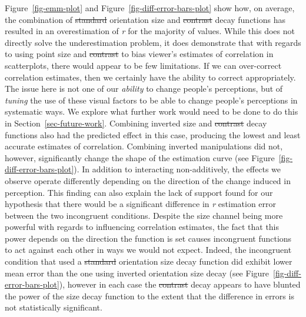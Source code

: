 \documentclass[manuscript, review, anonymous, screen]{acmart}
\providecommand{\DIFaddtex}[1]{{\protect\color{blue}\uwave{#1}}} %
\providecommand{\DIFdeltex}[1]{{\protect\color{red}\sout{#1}}}                      %
\providecommand{\DIFaddbegin}{} %
\providecommand{\DIFaddend}{} %
\providecommand{\DIFdelbegin}{} %
\providecommand{\DIFdelend}{} %
\providecommand{\DIFadd}[1]{\texorpdfstring{\DIFaddtex{#1}}{#1}} %
\providecommand{\DIFdel}[1]{\texorpdfstring{\DIFdeltex{#1}}{}} %
\newcommand{\DIFscaledelfig}{0.5}
\newlength{\DIFdelgraphicswidth} %
\newlength{\DIFdelgraphicsheight} %
\newcommand{\DIFaddincludegraphics}[2][]{{\color{blue}\fbox{\DIFOincludegraphics[#1]{#2}}}} %
\newcommand{\DIFdelincludegraphics}[2][]{%
\sbox{\DIFdelgraphicsbox}{\DIFOincludegraphics[#1]{#2}}%
\settoboxwidth{\DIFdelgraphicswidth}{\DIFdelgraphicsbox} %
\settoboxtotalheight{\DIFdelgraphicsheight}{\DIFdelgraphicsbox} %
\scalebox{\DIFscaledelfig}{%
\parbox[b]{\DIFdelgraphicswidth}{\usebox{\DIFdelgraphicsbox}\\[-\baselineskip] \rule{\DIFdelgraphicswidth}{0em}}\llap{\resizebox{\DIFdelgraphicswidth}{\DIFdelgraphicsheight}{%
\setlength{\unitlength}{\DIFdelgraphicswidth}%
\begin{picture}(1,1)%
\thicklines\linethickness{2pt} %
{\color[rgb]{1,0,0}\put(0,0){\framebox(1,1){}}}%
{\color[rgb]{1,0,0}\put(0,0){\line( 1,1){1}}}%
{\color[rgb]{1,0,0}\put(0,1){\line(1,-1){1}}}%
\end{picture}%
}\hspace*{3pt}}} %
} %
\DeclareRobustCommand{\DIFaddbegin}{\DIFOaddbegin \let\includegraphics\DIFaddincludegraphics} %
\DeclareRobustCommand{\DIFaddend}{\DIFOaddend \let\includegraphics\DIFOincludegraphics} %
\DeclareRobustCommand{\DIFdelbegin}{\DIFOdelbegin \let\includegraphics\DIFdelincludegraphics} %
\DeclareRobustCommand{\DIFdelend}{\DIFOaddend \let\includegraphics\DIFOincludegraphics} %
\begin{document}
Figure~\ref{fig-emm-plot} and Figure~\ref{fig-diff-error-bars-plot} show
how, on average, the combination of \DIFdelbegin \DIFdel{standard }\DIFdelend \DIFaddbegin \DIFadd{typical }\DIFaddend orientation size and \DIFdelbegin \DIFdel{contrast }\DIFdelend \DIFaddbegin \DIFadd{opacity
}\DIFaddend decay functions has resulted in an overestimation of \emph{r} for the
majority of values. While this does not directly solve the
underestimation problem, it does demonstrate that with regards to using
point size and \DIFdelbegin \DIFdel{contrast }\DIFdelend \DIFaddbegin \DIFadd{opacity }\DIFaddend to bias viewer's estimates of correlation in
scatterplots, there would appear to be few limitations. If we can
over-correct correlation estimates, then we certainly have the ability
to correct appropriately. The issue here is not one of our
\emph{ability} to change people's perceptions, but of \emph{tuning} the
use of these visual factors to be able to change people's perceptions in
systematic ways. We explore what further work would need to be done to
do this in Section~\ref{sec-future-work}. Combining inverted size and
\DIFdelbegin \DIFdel{contrast }\DIFdelend \DIFaddbegin \DIFadd{opacity }\DIFaddend decay functions also had the predicted effect in this case,
producing the lowest and least accurate estimates of correlation.
Combining inverted manipulations did not, however, significantly change
the shape of the estimation curve (see
Figure~\ref{fig-diff-error-bars-plot}). In addition to interacting
non-additively, the effects we observe operate differently depending on
the direction of the change induced in perception. This finding can also
explain the lack of support found for our hypothesis that there would be
a significant difference in \emph{r} estimation error between the two
incongruent conditions. Despite the size channel being more powerful
with regards to influencing correlation estimates, the fact that this
power depends on the direction the function is set causes incongruent
functions to act against each other in ways we would not expect. Indeed,
the incongruent condition that used a \DIFdelbegin \DIFdel{standard }\DIFdelend \DIFaddbegin \DIFadd{typical }\DIFaddend orientation size decay
function did exhibit lower mean error than the one using inverted
orientation size decay (see Figure~\ref{fig-diff-error-bars-plot}),
however in each case the \DIFdelbegin \DIFdel{contrast }\DIFdelend \DIFaddbegin \DIFadd{opacity }\DIFaddend decay appears to have blunted the power
of the size decay function to the extent that the difference in errors
is not statistically significant.
\end{document}
